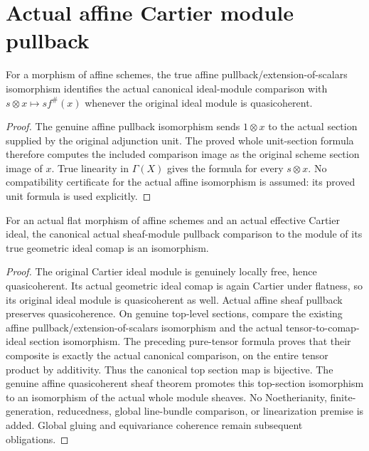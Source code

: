 \section{Actual affine Cartier module pullback}

\begin{lemma}
\label{lem:affine-cartier-module-pullback-tensor}
\leanok
For a morphism of affine schemes, the true affine pullback/extension-of-scalars
isomorphism identifies the actual canonical ideal-module comparison with
$s\otimes x\mapsto s f^\#(x)$ whenever the original ideal module is quasicoherent.
\end{lemma}
\begin{proof}
The genuine affine pullback isomorphism sends $1\otimes x$ to the actual
section supplied by the original adjunction unit. The proved
whole unit-section formula therefore computes the included comparison
image as the original scheme section image of $x$. True linearity in
$\Gamma(X)$ gives the formula for every $s\otimes x$. No compatibility
certificate for the actual affine isomorphism is assumed: its proved
unit formula is used explicitly.
\end{proof}

\begin{lemma}
\label{lem:affine-cartier-module-pullback-iso}
\leanok
For an actual flat morphism of affine schemes and an actual effective
Cartier ideal, the canonical actual sheaf-module pullback comparison to
the module of its true geometric ideal comap is an isomorphism.
\end{lemma}
\begin{proof}
The original Cartier ideal module is genuinely locally free, hence
quasicoherent. Its actual geometric ideal comap is again Cartier under
flatness, so its original ideal module is quasicoherent as well. Actual
affine sheaf pullback preserves quasicoherence. On genuine top-level
sections, compare the existing affine pullback/extension-of-scalars
isomorphism and the actual tensor-to-comap-ideal section isomorphism.
The preceding pure-tensor formula proves that their composite is exactly
the actual canonical comparison, on the entire tensor product by
additivity. Thus the canonical top section map is bijective. The genuine
affine quasicoherent sheaf theorem promotes this top-section isomorphism
to an isomorphism of the actual whole module sheaves. No Noetherianity,
finite-generation, reducedness, global line-bundle comparison, or
linearization premise is added. Global gluing and equivariance coherence
remain subsequent obligations.
\end{proof}
